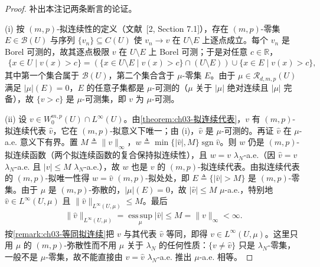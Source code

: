 \documentclass[../../main.tex]{subfiles}%
\begin{document}
\begin{proof}
补出本注记两条断言的论证。

(i) 按 $(m,p)$-拟连续性的定义（文献~[2, Section 7.1]），存在 $(m,p)$-零集 $E\in\mathcal{B}(U)$ 与序列 $\{v_n\}\subseteq C(U)$ 使 $v_n\to v$ 在 $U\setminus E$ 上逐点成立。每个 $v_n$ 是 Borel 可测的，故其逐点极限 $v$ 在 $U\setminus E$ 上 Borel 可测；于是对任意 $c\in\mathbb{R}$，
\begin{align*}
\{x\in U\mid v(x)>c\}=\left(\{x\in U\setminus E\mid v(x)>c\}\cap(U\setminus E)\right)\cup\{x\in E\mid v(x)>c\},
\end{align*}
其中第一个集合属于 $\mathcal{B}(U)$，第二个集合含于 $\mu$-零集 $E$。由于 $\mu\in\mathscr{R}_{d,m,p}(U)$ 满足 $|\mu|(E)=0$，$E$ 的任意子集都是 $\mu$-可测的（$\mu$ 关于 $|\mu|$ 绝对连续且 $|\mu|$ 完备），故 $\{v>c\}$ 是 $\mu$-可测集，即 $v$ 为 $\mu$-可测。

(ii) 设 $v\in W^{m,p}_0(U)\cap L^\infty(U)$。由\cref{theorem:ch03-拟连续代表}，$v$ 有 $(m,p)$-拟连续代表 $\widehat v$，它在 $(m,p)$-拟意义下唯一；由 (i)，$\widehat v$ 是 $\mu$-可测的。再证 $\widehat v$ 在 $\mu$-a.e. 意义下有界。置 $M\triangleq\|v\|_\infty$，$w\triangleq\min\{|\widehat v|,M\}\operatorname{sgn}\widehat v$。则 $w$ 仍是 $(m,p)$-拟连续函数（两个拟连续函数的复合保持拟连续性），且 $w=v$ $\lambda_N$-a.e.（因 $\widehat v=v$ $\lambda_N$-a.e. 且 $|v|\leqslant M$ $\lambda_N$-a.e.），故 $w$ 也是 $v$ 的 $(m,p)$-拟连续代表。由拟连续代表的 $(m,p)$-拟唯一性得 $w=\widehat v$ $(m,p)$-拟处处，即 $E\triangleq\{|\widehat v|>M\}$ 是 $(m,p)$-零集。由于 $\mu$ 是 $(m,p)$-弥散的，$|\mu|(E)=0$，故 $|\widehat v|\leqslant M$ $\mu$-a.e.，特别地 $\widehat v\in L^\infty(U,\mu)$ 且 $\|\widehat v\|_{L^\infty(U,\mu)}\leqslant M$。最后
\begin{align*}
\|\widehat v\|_{L^\infty(U,\mu)}=\operatorname*{ess\,sup}_{\mu}|\widehat v|\leqslant M=\|v\|_\infty<\infty.
\end{align*}
按\cref{remark:ch03-等同拟连续}把 $v$ 与其代表 $\widehat v$ 等同，即得 $v\in L^\infty(U,\mu)$。这里只用 $\mu$ 的 $(m,p)$-弥散性而不用 $\mu$ 关于 $\lambda_N$ 的任何性质：$\{v\neq\widehat v\}$ 只是 $\lambda_N$-零集，一般不是 $\mu$-零集，故不能直接由 $v=\widehat v$ $\lambda_N$-a.e. 推出 $\mu$-a.e. 相等。
\end{proof}
\end{document}
